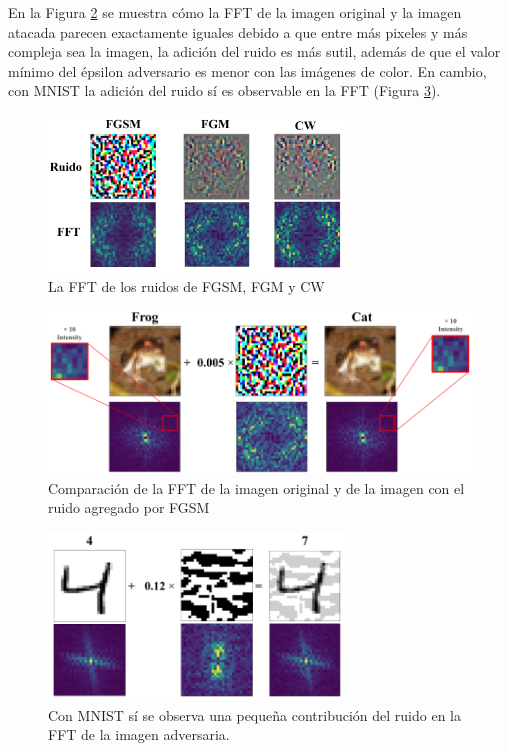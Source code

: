 En la Figura \ref{frog_cat_fft} se muestra cómo la FFT de la imagen original y la imagen atacada parecen exactamente iguales debido a que entre más pixeles y más compleja sea la imagen, la adición del ruido es más sutil, además de que el valor mínimo del épsilon adversario es menor con las imágenes de color. En cambio, con MNIST la adición del ruido sí es observable en la FFT (Figura \ref{fft_mnist}).

\begin{figure}[h!]
    \centering
    \includegraphics[width=0.7\textwidth]{images/cifar-10/frog_noises.png}
    \caption{La FFT de los ruidos de FGSM, FGM y CW}
    \label{frog_ruidos}
\end{figure}

\begin{figure}[h!]
    \centering
    \includegraphics[width=\textwidth]{images/cifar-10/frog_cat_fgsm_fft.png}
    \caption{Comparación de la FFT de la imagen original y de la imagen con el ruido agregado por FGSM}
    \label{frog_cat_fft}
\end{figure}

\begin{figure}[h!]
    \centering
    \includegraphics[width=0.7\textwidth]{images/mnist/ffts.png}
    \caption{Con MNIST sí se observa una pequeña contribución del ruido en la FFT de la imagen adversaria.}
    \label{fft_mnist}
\end{figure}


